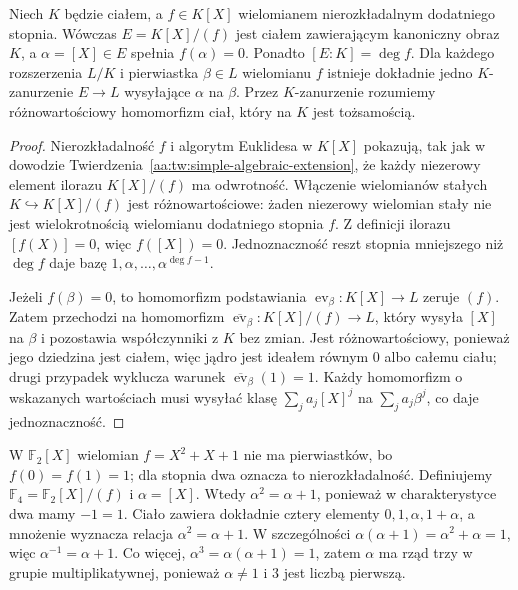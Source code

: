 \begin{twierdzenie}
\label{aa:tw:adjoin-root-abstract}
Niech $K$ będzie ciałem, a $f\in K[X]$ wielomianem
nierozkładalnym dodatniego stopnia. Wówczas
$E=K[X]/(f)$ jest ciałem zawierającym kanoniczny obraz
$K$, a $\alpha=[X]\in E$ spełnia $f(\alpha)=0$.
Ponadto $[E:K]=\deg f$. Dla każdego rozszerzenia
$L/K$ i pierwiastka $\beta\in L$ wielomianu $f$
istnieje dokładnie jedno $K$-zanurzenie
$E\to L$ wysyłające $\alpha$ na $\beta$.
Przez $K$-zanurzenie rozumiemy różnowartościowy
homomorfizm ciał, który na $K$ jest tożsamością.
\end{twierdzenie}
\begin{proof}
Nierozkładalność $f$ i algorytm Euklidesa w $K[X]$
pokazują, tak jak w dowodzie
Twierdzenia~\ref{aa:tw:simple-algebraic-extension},
że każdy niezerowy element ilorazu $K[X]/(f)$
ma odwrotność. Włączenie wielomianów stałych
$K\hookrightarrow K[X]/(f)$ jest różnowartościowe:
żaden niezerowy wielomian stały nie jest wielokrotnością
wielomianu dodatniego stopnia $f$.
Z definicji ilorazu $[f(X)]=0$, więc $f([X])=0$.
Jednoznaczność reszt stopnia mniejszego niż $\deg f$
daje bazę $1,\alpha,\dots,\alpha^{\deg f-1}$.

Jeżeli $f(\beta)=0$, to homomorfizm podstawiania
$\operatorname{ev}_\beta:K[X]\to L$ zeruje $(f)$.
Zatem przechodzi na homomorfizm
$\overline{\operatorname{ev}}_\beta:K[X]/(f)\to L$,
który wysyła $[X]$ na $\beta$ i pozostawia
współczynniki z $K$ bez zmian. Jest różnowartościowy,
ponieważ jego dziedzina jest ciałem, więc jądro jest
ideałem równym $0$ albo całemu ciału; drugi przypadek
wyklucza warunek $\overline{\operatorname{ev}}_\beta(1)=1$.
Każdy homomorfizm
o wskazanych wartościach musi wysyłać klasę
$\sum_j a_j[X]^j$ na $\sum_j a_j\beta^j$,
co daje jednoznaczność.
\end{proof}

\begin{przyklad}
\label{aa:prz:four-element-field}
W $\mathbb F_2[X]$ wielomian $f=X^2+X+1$ nie ma
pierwiastków, bo $f(0)=f(1)=1$; dla stopnia dwa
oznacza to nierozkładalność. Definiujemy
$\mathbb F_4=\mathbb F_2[X]/(f)$ i
$\alpha=[X]$. Wtedy $\alpha^2=\alpha+1$,
ponieważ w charakterystyce dwa mamy $-1=1$.
Ciało zawiera dokładnie cztery elementy
$0,1,\alpha,1+\alpha$, a mnożenie wyznacza
relacja $\alpha^2=\alpha+1$.
W szczególności
$\alpha(\alpha+1)=\alpha^2+\alpha=1$,
więc $\alpha^{-1}=\alpha+1$. Co więcej,
$\alpha^3=\alpha(\alpha+1)=1$, zatem $\alpha$
ma rząd trzy w grupie multiplikatywnej, ponieważ
$\alpha\ne1$ i $3$ jest liczbą pierwszą.
\end{przyklad}

